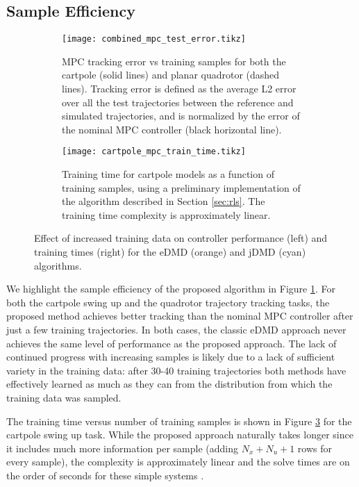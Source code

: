 \documentclass{article}
\begin{document}
\subsection{Sample Efficiency}
\begin{figure}[t]
  \centering
  \begin{subfigure}[t]{0.48\textwidth}
    \raggedleft
    \texttt{[image: combined\_mpc\_test\_error.tikz]}
    \caption{MPC tracking error vs training samples for both the cartpole (solid lines)
    and planar quadrotor (dashed lines). Tracking error
    is defined as the average L2 error over all the test trajectories between the reference
    and simulated trajectories, and is normalized by the error of the nominal MPC controller
    (black horizontal line).}
    \label{fig:cartpole_mpc_test_error}
  \end{subfigure}
  \hfill
  \begin{subfigure}[t]{0.48\textwidth}
    \texttt{[image: cartpole\_mpc\_train\_time.tikz]}
    \caption{Training time for cartpole models as a function of training samples, using a 
    preliminary implementation of the algorithm described in Section \ref{sec:rls}. The 
    training time complexity is approximately linear.}
    \label{fig:cartpole_train_time}
  \end{subfigure}
  \caption{Effect of increased training data on controller performance (left) and training 
  times (right) for the eDMD (orange) and jDMD (cyan) algorithms.}
\end{figure}

We highlight the sample efficiency of the proposed algorithm in Figure 
\ref{fig:cartpole_mpc_test_error}. For both the cartpole swing up and the quadrotor
trajectory tracking tasks, the proposed method achieves better tracking than the nominal MPC
controller after just a few training trajectories. In both cases, the classic eDMD approach
never achieves the same level of performance as the proposed approach. The lack of continued
progress with increasing samples is likely due to a lack of sufficient variety in the
training data: after 30-40 training trajectories both methods have effectively learned as
much as they can from the distribution from which the training data was sampled.

The training time versus number of training samples is shown in Figure 
\ref{fig:cartpole_train_time} for the cartpole swing up task. While the proposed approach 
naturally takes longer since it includes much more information per sample (adding 
$N_x + N_u + 1$ rows for every sample), the complexity is approximately linear and the 
solve times are on the order of seconds for these simple systems .
\end{document}
